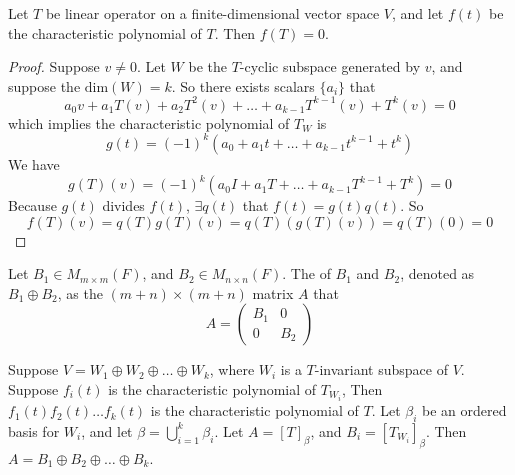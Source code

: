 \begin{theorem}
    Let $T$ be linear operator on a finite-dimensional vector space $V$, and let $f(t)$ be the characteristic polynomial of $T$. Then $f(T) = 0$.
\end{theorem}

\begin{proof}
    Suppose $v \neq 0$. Let $W$ be the $T$-cyclic subspace generated by $v$, and suppose the $\text{dim}(W)=k$. So there exists scalars $\{a_i\}$ that 
    \begin{equation*}
        a_0 v + a_1 T(v) + a_2 T^2(v) + \dots + a_{k-1} T^{k-1}(v) + T^k(v) = 0
    \end{equation*}
    which implies the characteristic polynomial of $T_W$ is
    \begin{equation*}
        g(t) = (-1)^k (a_0 + a_1 t + \dots + a_{k-1} t^{k-1} + t^k)
    \end{equation*}
    We have
    \begin{equation*}
        g(T)(v) = (-1)^k (a_0 I + a_1 T + \dots + a_{k-1} T^{k-1} + T^k) = 0
    \end{equation*}
    Because $g(t)$ divides $f(t)$, $\exists q(t)$ that $f(t) = g(t) q(t)$. So
    \begin{equation*}
        f(T)(v) = q(T)g(T)(v) = q(T) (g(T)(v)) = q(T)(0) = 0
    \end{equation*}
\end{proof}



\begin{definition}
    Let $B_1 \in M_{m \times m}(F)$, and $B_2 \in M_{n \times n} (F)$. The  of $B_1$ and $B_2$, denoted as $B_1 \oplus B_2$, as the $(m+n) \times (m+n)$ matrix $A$ that
    \begin{equation*}
        A = \begin{pmatrix}
            B_1 & 0 \\
            0 & B_2
        \end{pmatrix}
    \end{equation*}
\end{definition}


\begin{theorem}
    Suppose $V=W_1 \oplus W_2 \oplus \dots \oplus W_k$, where $W_i$ is a $T$-invariant subspace of $V$. Suppose $f_i(t)$ is the characteristic polynomial of $T_{W_i}$, Then $f_1(t) f_2(t) \dots f_k(t)$ is the characteristic polynomial of $T$. Let $\beta_i$ be an ordered basis for $W_i$, and let $\beta = \bigcup_{i=1}^k \beta_i$. Let $A=[T]_\beta$, and $B_i=[T_{W_i}]_\beta$. Then $A = B_1 \oplus B_2 \oplus \dots \oplus B_k$.
\end{theorem}